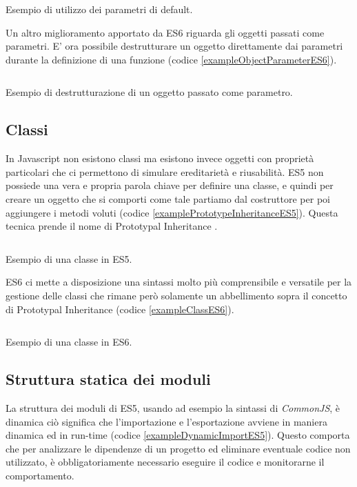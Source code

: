 \begin{listing}[ht]
\inputminted{Javascript}{sources/exampleDefaultParametersES6.js}
\caption{Esempio di utilizzo dei parametri di default.}
\label{exampleDefaultParametersES6}
\end{listing}

\noindent
Un altro miglioramento apportato da ES6 riguarda gli oggetti passati come parametri. E' ora possibile destrutturare un oggetto direttamente dai parametri durante la definizione di una funzione (codice \ref{exampleObjectParameterES6}).

\begin{listing}[ht]
\inputminted{Javascript}{sources/exampleObjectParameterES6.js}
\caption{Esempio di destrutturazione di un oggetto passato come parametro.}
\label{exampleObjectParameterES6}
\end{listing}

\subsection{Classi}
In Javascript non esistono classi ma esistono invece oggetti con proprietà particolari che ci permettono di simulare ereditarietà e riusabilità. ES5 non possiede una vera e propria parola chiave per definire una classe, e quindi per creare un oggetto che si comporti come tale partiamo dal costruttore per poi aggiungere i metodi voluti (codice \ref{examplePrototypeInheritanceES5}). Questa tecnica prende il nome di Prototypal Inheritance \cite{RylanOnPrototypeInheritance}.

\begin{listing}[ht]
\inputminted{Javascript}{sources/examplePrototypeInheritanceES5.js}
\caption{Esempio di una classe in ES5.}
\label{examplePrototypeInheritanceES5}
\end{listing}

\noindent
ES6 ci mette a disposizione una sintassi molto più comprensibile e versatile per la gestione delle classi che rimane però solamente un abbellimento sopra il concetto di Prototypal Inheritance (codice \ref{exampleClassES6}). 

\begin{listing}[ht]
\inputminted{Javascript}{sources/exampleClassES6.js}
\caption{Esempio di una classe in ES6.}
\label{exampleClassES6}
\end{listing}

\subsection{Struttura statica dei moduli}
La struttura dei moduli di ES5, usando ad esempio la sintassi di \textit{CommonJS}\footnotemark, è dinamica ciò significa che l'importazione e l'esportazione avviene in maniera dinamica ed in run-time (codice \ref{exampleDynamicImportES5}). Questo comporta che per analizzare le dipendenze di un progetto ed eliminare eventuale codice non utilizzato, è obbligatoriamente necessario eseguire il codice e monitorarne il comportamento.


